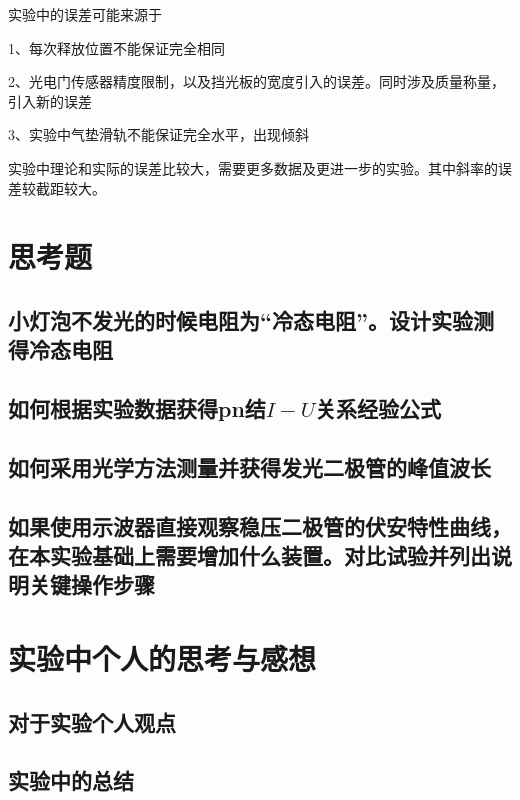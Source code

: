 \documentclass{ctexart}
\begin{document}
  实验中的误差可能来源于 
  
  1、每次释放位置不能保证完全相同

  2、光电门传感器精度限制，以及挡光板的宽度引入的误差。同时涉及质量称量，引入新的误差

  3、实验中气垫滑轨不能保证完全水平，出现倾斜

  实验中理论和实际的误差比较大，需要更多数据及更进一步的实验。其中斜率的误差较截距较大。
\newpage

\section{思考题}
  \subsection{小灯泡不发光的时候电阻为“冷态电阻”。设计实验测得冷态电阻}

  \subsection{如何根据实验数据获得pn结$I-U$关系经验公式}

  \subsection{如何采用光学方法测量并获得发光二极管的峰值波长}

  \subsection{如果使用示波器直接观察稳压二极管的伏安特性曲线，在本实验基础上需要增加什么装置。对比试验并列出说明关键操作步骤}
\newpage

\section{实验中个人的思考与感想}
  \subsection{对于实验个人观点}

  \subsection{实验中的总结}
\end{document}
